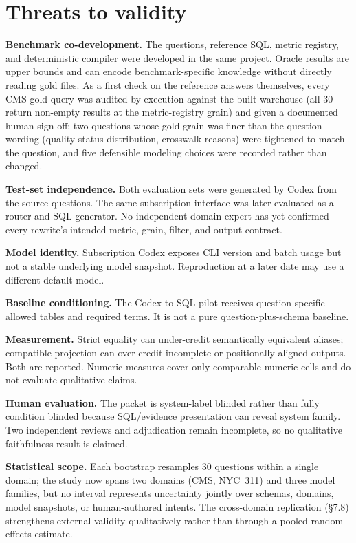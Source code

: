 \documentclass[11pt]{article}
\begin{document}
\section{Threats to validity}

\noindent\textbf{Benchmark co-development.} The questions, reference SQL, metric
registry, and deterministic compiler were developed in the same project. Oracle
results are upper bounds and can encode benchmark-specific knowledge without
directly reading gold files. As a first check on the reference answers
themselves, every CMS gold query was audited by execution against the built
warehouse (all 30 return non-empty results at the metric-registry grain) and
given a documented human sign-off; two questions whose gold grain was finer than
the question wording (quality-status distribution, crosswalk reasons) were
tightened to match the question, and five defensible modeling choices were
recorded rather than changed.

\medskip\noindent\textbf{Test-set independence.} Both evaluation sets were
generated by Codex from the source questions. The same subscription interface was
later evaluated as a router and SQL generator. No independent domain expert has
yet confirmed every rewrite's intended metric, grain, filter, and output
contract.

\medskip\noindent\textbf{Model identity.} Subscription Codex exposes CLI version
and batch usage but not a stable underlying model snapshot. Reproduction at a
later date may use a different default model.

\medskip\noindent\textbf{Baseline conditioning.} The Codex-to-SQL pilot receives
question-specific allowed tables and required terms. It is not a pure
question-plus-schema baseline.

\medskip\noindent\textbf{Measurement.} Strict equality can under-credit
semantically equivalent aliases; compatible projection can over-credit incomplete
or positionally aligned outputs. Both are reported. Numeric measures cover only
comparable numeric cells and do not evaluate qualitative claims.

\medskip\noindent\textbf{Human evaluation.} The packet is system-label blinded
rather than fully condition blinded because SQL/evidence presentation can reveal
system family. Two independent reviews and adjudication remain incomplete, so no
qualitative faithfulness result is claimed.

\medskip\noindent\textbf{Statistical scope.} Each bootstrap resamples 30
questions within a single domain; the study now spans two domains (CMS, NYC~311)
and three model families, but no interval represents uncertainty jointly over
schemas, domains, model snapshots, or human-authored intents. The cross-domain
replication (\S7.8) strengthens external validity qualitatively rather than
through a pooled random-effects estimate.
\end{document}
